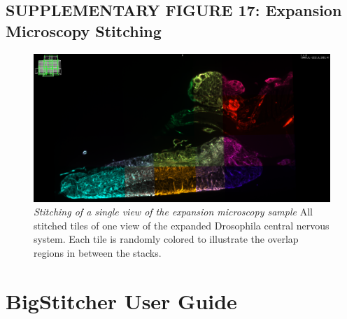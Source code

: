 \documentclass[]{spie}  %
\begin{document}
\subsection*{SUPPLEMENTARY FIGURE 17: Expansion Microscopy Stitching}
\vspace{1mm}
\begin{figure}[h!]
\includegraphics[width=\textwidth]{fig-expansion_tiling.png}
\vspace{-2.0mm}
\caption{\hspace{-0.5mm} \emph{Stitching of a single view of the expansion microscopy sample} All stitched tiles of one view of the expanded Drosophila central nervous system. Each tile is randomly colored to illustrate the overlap regions in between the stacks.
}
\label{fig:sup-fig-expansion-microscopy}
\end{figure}

\pagebreak



\section{BigStitcher User Guide}
\label{sec:documentation}



\pagebreak




\end{document}

